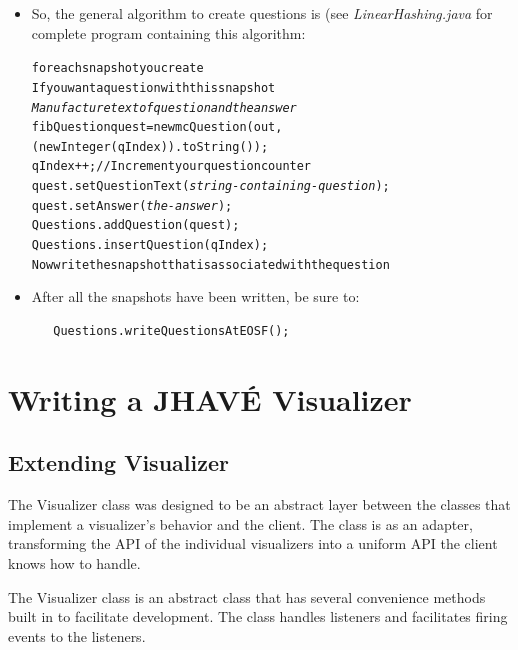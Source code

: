\documentclass[11pt,letterpaper]{book}
\begin{document}
\begin{itemize}
\begin{verbatim}
    // Construct the fib question, providing its identifying string
    public fibQuestion(PrintWriter out, String id){

    // Set the answer for this fib question
    // Use \n to separate different answers that are allowed
    public void setAnswer(String answer){

\end{verbatim}
\normalsize
\item So, the general algorithm to create questions is (see
  \textit{LinearHashing.java} for complete program containing this
  algorithm:

\small
\begin{alltt}
for each snapshot you create
  If you want a question with this snapshot
     \textit{Manufacture text of question and the answer}
     fibQuestion quest = new mcQuestion(out, (new Integer(qIndex)).toString());
     qIndex++;  // Increment your question counter
     quest.setQuestionText(\textit{string-containing-question});
     quest.setAnswer(\textit{the-answer});
     Questions.addQuestion(quest);
     Questions.insertQuestion(qIndex);
  Now write the snapshot that is associated with the question
\end{alltt}
\normalsize
\item After all the snapshots have been written, be sure to:

\small
\begin{verbatim}
   Questions.writeQuestionsAtEOSF();
\end{verbatim}
\end{itemize}

\chapter{Writing a JHAV\'{E} Visualizer}

\section{Extending Visualizer}

The Visualizer class was designed to be an abstract layer between the
classes that implement a visualizer's behavior and the client. The
class is as an adapter, transforming the API of the individual
visualizers into a uniform API the client knows how to handle.

The Visualizer class is an abstract class that has several convenience
methods built in to facilitate development. The class handles
listeners and facilitates firing events to the listeners.
\end{document}
